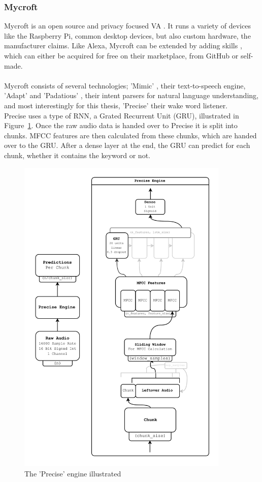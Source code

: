 \subsubsection{Mycroft}

Mycroft is an open source \cite{mycroft_gh} and privacy focused VA \cite{mycroft}.
It runs a variety of devices like the Raspberry Pi, common desktop devices, but also custom hardware, the manufacturer claims.
Like Alexa, Mycroft can be extended by adding skills \cite{mycroft_skills}, which can either be acquired for free on their marketplace,
from GitHub or self-made.\\\\
Mycroft consists of several technologies; 'Mimic' \cite{mycroft_mimic3}, their text-to-speech engine, 'Adapt' \cite{mycroft_adapt} and 'Padatious' \cite{mycroft_padatious},
their intent parsers for natural language understanding, and most interestingly for this thesis, 'Precise' \cite{mycroft_precise} their wake word listener.\\
Precise uses a type of RNN, a Grated Recurrent Unit (GRU), illustrated in Figure~\ref{fig:precise_gru}.
Once the raw audio data is handed over to Precise it is split into chunks.
MFCC features are then calculated from these chunks, which are handed over to the GRU.
After a dense layer at the end, the GRU can predict for each chunk, whether it contains the keyword or not.


\begin{figure}[htb]
    \centering
    \includegraphics[width=0.9\textwidth]{figures/precise_engine.PNG}
    \caption[Illustration: The 'Precise' engine \cite{mycroft_precise}]{The 'Precise' engine illustrated}
    \label{fig:precise_gru}
\end{figure}
